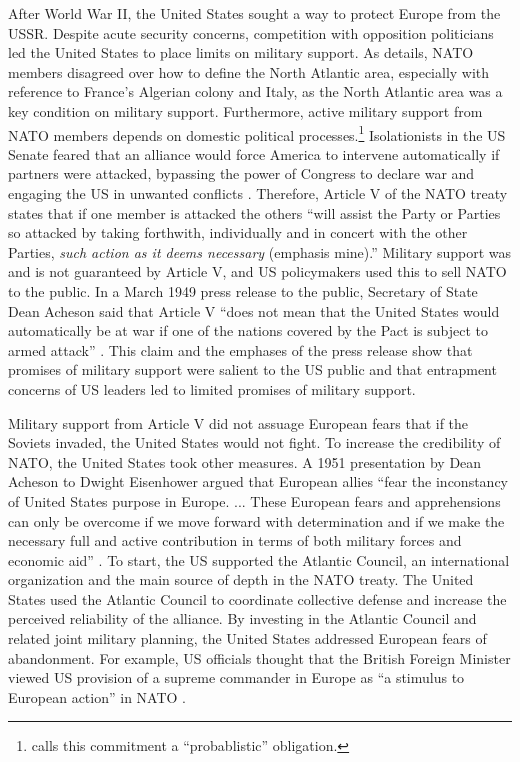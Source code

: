 \documentclass[12pt]{article}
\begin{document}
After World War II, the United States sought a way to protect Europe from the USSR. 
Despite acute security concerns, competition with opposition politicians led the United States to place limits on military support. 
As \citet{Poast2019a} details, NATO members disagreed over how to define the North Atlantic area, especially with reference to France's Algerian colony and Italy, as the North Atlantic area was a key condition on military support. 
Furthermore, active military support from NATO members depends on domestic political processes.\footnote{\citet{Benson2012} calls this commitment a ``probablistic'' obligation.} 
Isolationists in the US Senate feared that an alliance would force America to intervene automatically if partners were attacked, bypassing the power of Congress to declare war and engaging the US in unwanted conflicts \citep[pg. 280-1]{Acheson1969}.
Therefore, Article V of the NATO treaty states that if one member is attacked the others ``will assist the Party or Parties so attacked by taking forthwith, individually and in concert with the other Parties, \emph{such action as it deems necessary} (emphasis mine).'' 
Military support was and is not guaranteed by Article V, and US policymakers used this to sell NATO to the public. 
In a March 1949 press release to the public, Secretary of State Dean Acheson said that Article V ``does not mean that the United States would automatically be at war if one of the nations covered by the Pact is subject to armed attack'' \citep{Acheson1949}.
This claim and the emphases of the press release show that promises of military support were salient to the US public and that entrapment concerns of US leaders led to limited promises of military support. 


Military support from Article V did not assuage European fears that if the Soviets invaded, the United States would not fight. 
To increase the credibility of NATO, the United States took other measures.  
A 1951 presentation by Dean Acheson to Dwight Eisenhower argued that European allies ``fear the inconstancy of United States purpose in Europe. ... These European fears and apprehensions can only be overcome if we move forward with determination and if we make the necessary full and active contribution in terms of both military forces and economic aid'' \citep[pg. 3]{Acheson1951}. 
To start, the US supported the Atlantic Council, an international organization and the main source of depth in the NATO treaty. 
The United States used the Atlantic Council to coordinate collective defense and increase the perceived reliability of the alliance. 
By investing in the Atlantic Council and related joint military planning, the United States addressed European fears of abandonment. 
For example, US officials thought that the British Foreign Minister viewed US provision of a supreme commander in Europe as ``a stimulus to European action'' in NATO \citep{Acheson1950}. 
\end{document}
